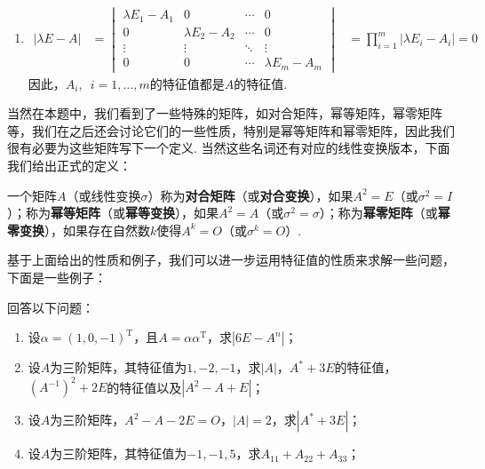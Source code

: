 \begin{solution}
\begin{enumerate}
        \item \begin{align*}
                  |\lambda E-A| & =\begin{vmatrix}
                                       \lambda E_1-A_1 & 0               & \cdots & 0               \\
                                       0               & \lambda E_2-A_2 & \cdots & 0               \\
                                       \vdots          & \vdots          & \ddots & \vdots          \\
                                       0               & 0               & \cdots & \lambda E_m-A_m
                                   \end{vmatrix}
                                & =\prod_{i=1}^{m}|\lambda E_i-A_i|=0
              \end{align*}
              因此，$A_i,\enspace i=1,\ldots,m$的特征值都是$A$的特征值.
    \end{enumerate}
\end{solution}

当然在本题中，我们看到了一些特殊的矩阵，如对合矩阵，幂等矩阵，幂零矩阵等，我们在之后还会讨论它们的一些性质，特别是幂等矩阵和幂零矩阵，因此我们很有必要为这些矩阵写下一个定义. 当然这些名词还有对应的线性变换版本，下面我们给出正式的定义：
\begin{definition}{}{}
    一个矩阵$A$（或线性变换$\sigma$）称为\textbf{对合矩阵}（或\textbf{对合变换}），如果$A^2=E$（或$\sigma^2=I$）；称为\textbf{幂等矩阵}（或\textbf{幂等变换}），如果$A^2=A$（或$\sigma^2=\sigma$）；称为\textbf{幂零矩阵}（或\textbf{幂零变换}），如果存在自然数$k$使得$A^k=O$（或$\sigma^k=O$）.
\end{definition}

基于上面给出的性质和例子，我们可以进一步运用特征值的性质来求解一些问题，下面是一些例子：
\begin{example}{}{}
    回答以下问题：
    \begin{enumerate}
        \item 设$\alpha=(1,0,-1)^\mathrm{T}$，且$A=\alpha\alpha^\mathrm{T}$，求$|6E-A^n|$；

        \item 设$A$为三阶矩阵，其特征值为$1,-2,-1$，求$|A|$，$A^*+3E$的特征值，$(A^{-1})^2+2E$的特征值以及$|A^2-A+E|$；

        \item 设$A$为三阶矩阵，$A^2-A-2E=O$，$|A|=2$，求$|A^*+3E|$；

        \item 设$A$为三阶矩阵，其特征值为$-1,-1,5$，求$A_{11}+A_{22}+A_{33}$；
    \end{enumerate}
\end{example}

